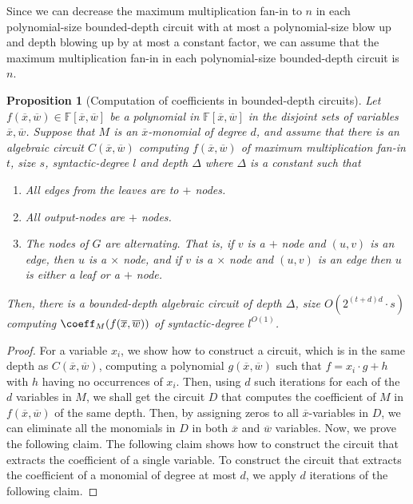 \documentclass[11pt,letter]{article}
\newtheorem{proposition}[theorem]{Proposition}
\theoremstyle{remark} %
\begin{document}
{    Since we can decrease the maximum multiplication fan-in to $n$ in each polynomial-size bounded-depth circuit with at most a polynomial-size blow up and depth blowing up by at most a constant factor, we can assume that the maximum multiplication fan-in in each polynomial-size bounded-depth circuit is $n$.
    
    \begin{proposition}[Computation of coefficients in bounded-depth circuits] 
        \label{prop: computation of coefficients in constant-depth circuits}
        Let $f(\overline{x},\overline{w}) \in \mathbb{F}[\overline{x},\overline{w}]$ be a polynomial in $\mathbb{F}[\overline{x},\overline{w}]$ in the disjoint sets of variables $\overline{x},\overline{w}$. Suppose that $M$ is an $\overline{x}$-monomial of degree $d$, and assume that there is an algebraic circuit $C(\overline{x},\overline{w})$ computing $f(\overline{x},\overline{w})$ of maximum multiplication fan-in $t$, size $s$, syntactic-degree $l$ and depth $\Delta$ where $\Delta$ is a constant such that
        \begin{enumerate}
            \item All edges from the leaves are to $+$ nodes.
            \item All output-nodes are $+$ nodes.
            \item The nodes of $G$ are alternating. That is, if $v$ is a $+$ node and $(u,v)$ is an edge, then $u$ is a $\times$ node, and if $v$ is a $\times$ node and $(u,v)$ is an edge then $u$ is either a leaf or a $+$ node.
        \end{enumerate}
        Then, there is a bounded-depth algebraic circuit of depth $\Delta$, size $O(2^{(t+d)d} \cdot s)$ computing $\coeff_M(f(\overline{x},\overline{w}))$ of syntactic-degree $l^{O(1)}$.
    \end{proposition}
    \begin{proof}
        For a variable $x_i$, we show how to construct a circuit, which is in the same depth as $C(\overline{x},\overline{w})$, computing a polynomial $g(\overline{x},\overline{w})$ such that $f=x_i \cdot g + h$ with $h$ having no occurrences of $x_i$. Then, using $d$ such iterations for each of the $d$ variables in $M$, we shall get the circuit $D$ that computes the coefficient of $M$ in $f(\overline{x},\overline{w})$ of the same depth. Then, by assigning zeros to all $\overline{x}$-variables in $D$, we can eliminate all the monomials in $D$ in both $\overline{x}$ and $\overline{w}$ variables. Now, we prove the following claim. The following claim shows how to construct the circuit that extracts the coefficient of a single variable. To construct the circuit that extracts the coefficient of a monomial of degree at most $d$, we apply $d$ iterations of the following claim.  

\end{proof}}
\end{document}
